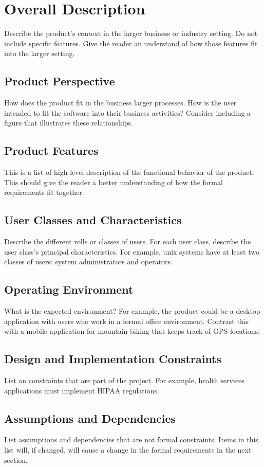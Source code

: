 \section{Overall Description}
 Describe the product's context in the larger business or industry setting.  Do
 not include specific features.  Give the reader an understand of how those
 features fit into the larger setting. 


\subsection{Product Perspective}
 How does the product fit in the business larger processes.  How is the user
 intended to fit the software into their business activities?   Consider
 including a figure that illustrates these relationships. 

\subsection{Product Features}
 This is a list of high-level description of the functional behavior of the
 product.  This should give the reader a better understanding of how the formal
 requirements fit together. 

\subsection{User Classes and Characteristics}
 Describe the different rolls or classes of users.  For each user class,
 describe the user class's principal characteristics.  For example, unix
 systems have at least two classes of users: system administrators and
 operators.  

\subsection{Operating Environment}
What is the expected environment?  For example, the product could be a desktop
application with users who work in a formal office environment.  Contrast this
with a mobile application for mountain biking that keeps track of GPS locations.

\subsection{Design and Implementation Constraints}
 List an constraints that are part of the project.  For example, health
 services applications must implement HIPAA regulations.  

\subsection{Assumptions and Dependencies}
 List assumptions and dependencies that are not formal constraints.  Items in
 this list will, if changed, will cause a change in the formal requirements in
 the next section.

